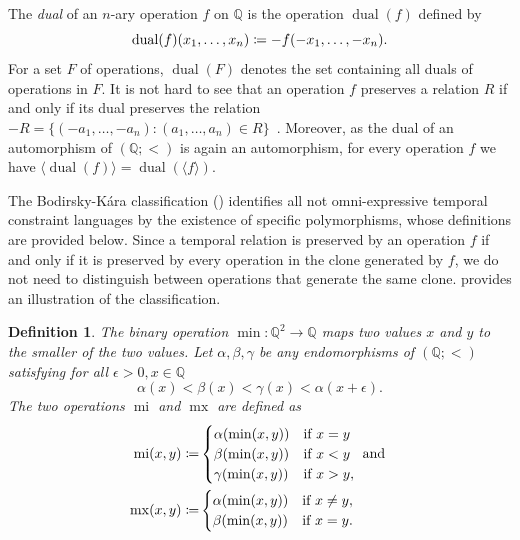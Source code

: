 \documentclass[a4paper,reqno, cleveref]{amsart}
\newcommand{\coloneqq}{\mathrel{\mathop:}\mathrel{\mkern-1.2mu}=}
\newtheorem{definition}[theorem]{Definition}
\newcommand{\Q}{\mathbb{Q}}
\DeclareMathOperator{\mx}{mx}
\DeclareMathOperator{\mi}{mi}
\DeclareMathOperator{\dual}{dual}
\newcommand{\gen}[1]{\langle#1\rangle}
\begin{document}
The \emph{dual} of an $n$-ary operation $f$  on $\Q$ is the operation $\dual(f)$ defined by  
\[\dual(f)(x_1, \dots, x_n)\coloneqq-f(-x_1, \dots , -x_n).\]
%
For a set $F$ of operations, $\dual(F)$ denotes the set containing all duals of operations in $F$.
%
It is not hard to see that an operation $f$ preserves a relation $R$ if and only if its dual preserves the relation $-R=\{(-a_1, \dots, -a_n): (a_1, \dots, a_n)\in R\}$~\cite{bodirsky_complexity_2010}.
%
Moreover, as the dual of an automorphism of $(\Q;<)$ is again an automorphism, for every operation $f$ we have $\gen{\dual(f)}=\dual(\gen f)$. 


The Bodirsky-K\'ara classification () identifies all not omni-expressive temporal constraint languages by the existence of specific polymorphisms, whose definitions are provided below. Since a temporal relation is preserved by an operation $f$ if and only if it is preserved by every operation in the clone generated by $f$, we do not need to distinguish between operations that generate the same clone.  provides an illustration of the classification.

\begin{definition}\label{def:mi_mx} The binary operation $\min:\Q^2\to \Q$ maps two values $x$ and $y$ to the smaller of the two values. 
    Let $\alpha, \beta, \gamma$ be any endomorphisms of $(\Q; <)$ satisfying for all $\epsilon >0, x \in \Q$ 
    \begin{equation*}
         \alpha(x)<\beta(x) < \gamma(x) < \alpha(x+\epsilon).
    \end{equation*} 
    The two operations $\mi$ and $\mx$ are defined as
    \begin{align*}
        \mi(x,y)\coloneqq &\begin{cases}
            \alpha(\min(x,y)) & \textnormal{if} \ x = y \\ \beta (\min(x,y)) & \textnormal{if} \ x<y \\ \gamma (\min(x,y)) & \textnormal{if} \ x>y,
        \end{cases}
        \textnormal{ and } \\
        \mx(x,y)\coloneqq &  \begin{cases}
        \alpha(\min(x,y)) & \text{if } x\neq y, 	\\ \beta(\min(x,y)) & \text{if } x= y.
        \end{cases}
    \end{align*}
\end{definition}
\end{document}
